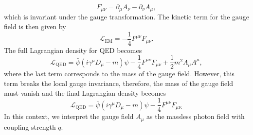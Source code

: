 \begin{equation}
  F_{\mu\nu} = \partial_{\mu}A_{\nu} - \partial_{\nu}A_{\mu},
  \label{eq:qed_field_strength_tensor}
\end{equation}
which is invariant under the gauge transformation. The kinetic term for the gauge field is then given by
\begin{equation}
  \mathcal{L}_{\mathrm{EM}} = - \frac{1}{4}F^{\mu\nu}F_{\mu\nu}.
  \label{eq:qed_em_free_lagrangian}
\end{equation}
The full Lagrangian density for QED becomes
\begin{equation}
  \mathcal{L}_{\mathrm{QED}} = \bar{\psi}(i\gamma^{\mu}D_{\mu} - m)\psi - \frac{1}{4}F^{\mu\nu}F_{\mu\nu} + \frac{1}{2}m^{2}A_{\mu}A^{\mu},
  \label{eq:qed_lagrangian}
\end{equation}
where the last term corresponds to the mass of the gauge field. However, this term breaks the local gauge invariance, therefore, the mass of the gauge field must vanish and the final Lagrangian density becomes 
\begin{equation}
  \mathcal{L}_{\mathrm{QED}} = \bar{\psi}(i\gamma^{\mu}D_{\mu} - m)\psi - \frac{1}{4}F^{\mu\nu}F_{\mu\nu.}
  \label{eq:qed_lagrangian_final}
\end{equation}
In this context, we interpret the gauge field $A_{\mu}$ as the massless photon field with coupling strength $q$.

